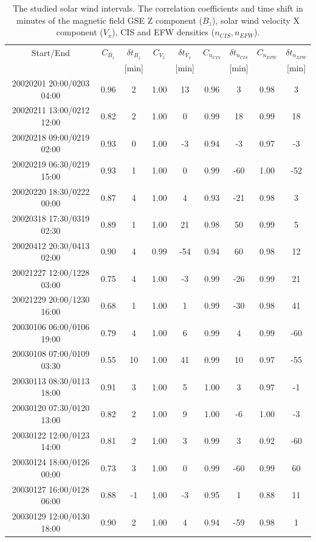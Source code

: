\documentclass[linenumbers,draft]{agujournal}
\begin{document}
\pagebreak


\pagebreak

\begin{table}[h]
\setlength{\tabcolsep}{3pt}
\centering
\begin{tabular}{c||cc|cc|cc|cc}
\hline
Start/End & $C_{B_{z}}$ & $\delta t_{B_{z}}$ & $C_{V_{x}}$ & $\delta t_{V_{x}}$ & $C_{n_{CIS}}$ & $\delta t_{n_{CIS}}$ & $C_{n_{EFW}}$ & $\delta t_{n_{EFW}}$ \\
& & [min] & & [min] & & [min] & & [min] \\
\hline
20020201 20:00/0203 04:00 & 0.96 & 2 & 1.00 & 13 & 0.96 & 3 & 0.98 & 3 \\
20020211 13:00/0212 12:00 & 0.82 & 2 & 1.00 & 0 & 0.99 & 18 & 0.99 & 18 \\
20020218 09:00/0219 02:00 & 0.93 & 0 & 1.00 & -3 & 0.94 & -3 & 0.97 & -3 \\
20020219 06:30/0219 15:00 & 0.93 & 1 & 1.00 & 0 & 0.99 & -60 & 1.00 & -52 \\
20020220 18:30/0222 00:00 & 0.87 & 4 & 1.00 & 4 & 0.93 & -21 & 0.98 & 3 \\
20020318 17:30/0319 02:30 & 0.89 & 1 & 1.00 & 21 & 0.98 & 50 & 0.99 & 5 \\
20020412 20:30/0413 02:00 & 0.90 & 4 & 0.99 & -54 & 0.94 & 60 & 0.98 & 12 \\
20021227 12:00/1228 03:00 & 0.75 & 4 & 1.00 & -3 & 0.99 & -26 & 0.99 & 21 \\
20021229 20:00/1230 16:00 & 0.68 & 1 & 1.00 & 1 & 0.99 & -30 & 0.98 & 41 \\
20030106 06:00/0106 19:00 & 0.79 & 4 & 1.00 & 6 & 0.99 & 4 & 0.99 & -60 \\
20030108 07:00/0109 03:30 & 0.55 & 10 & 1.00 & 41 & 0.99 & 10 & 0.97 & -55 \\
20030113 08:30/0113 18:00 & 0.91 & 3 & 1.00 & 5 & 1.00 & 3 & 0.97 & -1 \\
20030120 07:30/0120 13:00 & 0.82 & 2 & 1.00 & 9 & 1.00 & -6 & 1.00 & -3 \\
20030122 12:00/0123 14:00 & 0.81 & 2 & 1.00 & 3 & 0.99 & 3 & 0.92 & -60 \\
20030124 18:00/0126 00:00 & 0.73 & 3 & 1.00 & 0 & 0.99 & -60 & 0.99 & 60 \\
20030127 16:00/0128 06:00 & 0.88 & -1 & 1.00 & -3 & 0.95 & 1 & 0.88 & 11 \\
20030129 12:00/0130 18:00 & 0.90 & 2 & 1.00 & 4 & 0.94 & -59 & 0.98 & 1 \\
\hline
\end{tabular}
\caption{The studied solar wind intervals.  The correlation coefficients and time shift in minutes of the magnetic field GSE Z component ($B_z$), solar wind velocity X component ($V_x$), CIS and EFW densities ($n_{CIS}, n_{EFW}$).\label{tab:sw}}
\end{table}
\end{document}
